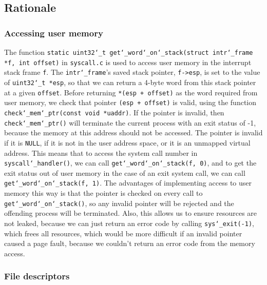 \documentclass{article}
\renewcommand{\_}{\char`_}
\begin{document}
\subsection{Rationale}

\subsubsection{Accessing user memory}

The function \texttt{static uint32\_t get\_word\_on\_stack(struct intr\_frame *f, int offset)} in \texttt{syscall.c} is used to access user memory in the interrupt stack frame \texttt{f}. The \texttt{intr\_frame}'s saved stack pointer, \texttt{f->esp}, is set to the value of \texttt{uint32\_t *esp}, so that we can return a 4-byte word from this stack pointer at a given \texttt{offset}. Before returning \texttt{*(esp + offset)} as the word required from user memory, we check that pointer \texttt{(esp + offset)} is valid, using the function \texttt{check\_mem\_ptr(const void *uaddr)}. If the pointer is invalid, then \texttt{check\_mem\_ptr()} will terminate the current process with an exit status of -1, because the memory at this address should not be accessed. The pointer is invalid if it is \texttt{NULL}, if it is not in the user address space, or it is an unmapped virtual address. This means that to access the system call number in \texttt{syscall\_handler()}, we can call \texttt{get\_word\_on\_stack(f, 0)}, and to get the exit status out of user memory in the case of an exit system call, we can call \texttt{get\_word\_on\_stack(f, 1)}. The advantages of implementing access to user memory this way is that the pointer is checked on every call to \texttt{get\_word\_on\_stack()}, so any invalid pointer will be rejected and the offending process will be terminated. Also, this allows us to ensure resources are not leaked, because we can just return an error code by calling \texttt{sys\_exit(-1)}, which frees all resources, which would be more difficult if an invalid pointer caused a page fault, because we couldn't return an error code from the memory access.

\subsubsection{File descriptors}
\end{document}
